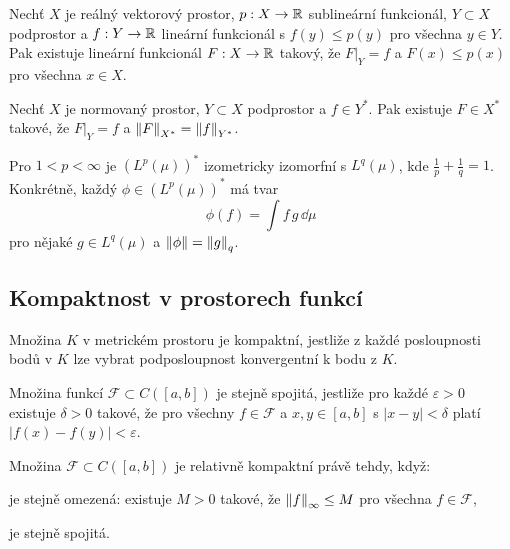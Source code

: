 \begin{theorem}
\label{vet:hahn-banach}
Nechť $X$ je reálný vektorový prostor, $p:X\to\mathbb{R}$ sublineární funkcionál, $Y\subset X$ podprostor a $f:Y\to\mathbb{R}$ lineární funkcionál s $f(y)\le p(y)$ pro všechna $y\in Y$. Pak existuje lineární funkcionál $F:X\to\mathbb{R}$ takový, že $F|_Y=f$ a $F(x)\le p(x)$ pro všechna $x\in X$.
\end{theorem}

\begin{corollary}
\label{dusl:rozsireni-funkcionalu}
Nechť $X$ je normovaný prostor, $Y\subset X$ podprostor a $f\in Y^*$. Pak existuje $F\in X^*$ takové, že $F|_Y=f$ a $\left\lVert F \right\rVert_{X^*}=\left\lVert f \right\rVert_{Y^*}$.
\end{corollary}

\begin{theorem}
\label{vet:reprezentace-Lp}
Pro $1<p<\infty$ je $(L^p(\mu))^*$ izometricky izomorfní s $L^q(\mu)$, kde $\frac1p+\frac1q=1$. Konkrétně, každý $\phi\in (L^p(\mu))^*$ má tvar
\[
\phi(f)=\int f\,g\,\dd\mu
\]
pro nějaké $g\in L^q(\mu)$ a $\left\lVert \phi \right\rVert=\left\lVert g \right\rVert_q$.
\end{theorem}

\spc

\subsection{Kompaktnost v prostorech funkcí}
\label{subsec:kompaktnost}

\begin{definition}
\label{def:kompaktni-mnozina}
Množina $K$ v metrickém prostoru je kompaktní, jestliže z každé posloupnosti bodů v $K$ lze vybrat podposloupnost konvergentní k bodu z $K$.
\end{definition}

\begin{definition}
\label{def:stejna-spojitost}
Množina funkcí $\mathcal{F}\subset C([a,b])$ je stejně spojitá, jestliže pro každé $\varepsilon>0$ existuje $\delta>0$ takové, že pro všechny $f\in\mathcal{F}$ a $x,y\in[a,b]$ s $|x-y|<\delta$ platí $|f(x)-f(y)|<\varepsilon$.
\end{definition}

\begin{theorem}
\label{vet:arzela-ascoli}
Množina $\mathcal{F}\subset C([a,b])$ je relativně kompaktní právě tehdy, když:
\begin{romanenum}
\item je stejně omezená: existuje $M>0$ takové, že $\left\lVert f \right\rVert_\infty\le M$ pro všechna $f\in\mathcal{F}$,
\item je stejně spojitá.
\end{romanenum}
\end{theorem}

